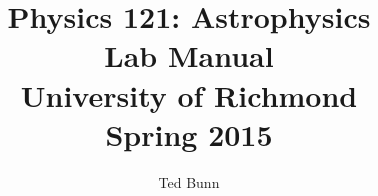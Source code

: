 \documentclass[twoside]{report}
\begin{document}
\title{Physics 121: Astrophysics \\ Lab Manual \\ University of Richmond
\\ Spring 2015}
\author{Ted Bunn}
\maketitle
\tableofcontents



\end{document}
